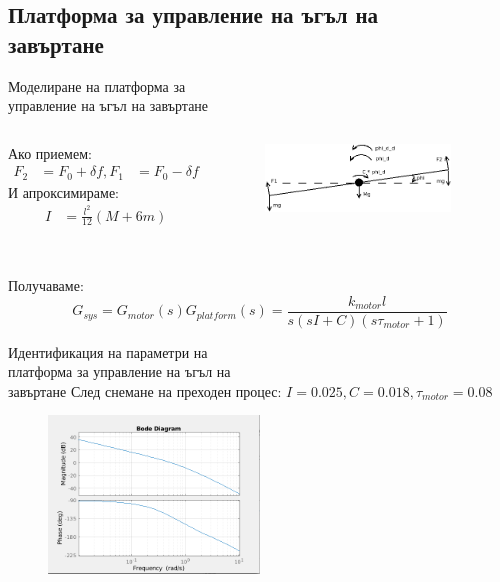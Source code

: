 \documentclass[handout]{beamer}
\begin{document}
\subsection{Платформа за управление на ъгъл на\\ завъртане}

\begin{frame}{Моделиране на платформа за\\управление на ъгъл на завъртане}
	\begin{columns}

		Ако приемем:
		\begin{align*}
			F_2 &= F_0 + \delta f,F_1 &= F_0 - \delta f 
		\end{align*}
		И апроксимираме:
		\begin{align*}
			I &= \frac{l^2}{12}(M + 6m)
		\end{align*}\\[1em]

		
		\begin{figure}[htpb!]
			\centering
			\includegraphics[width=0.9\textwidth]{Images/balance_force_diagram.png}
		\end{figure}

	\end{columns}

	Получаваме:
	\begin{equation*}
	G_{sys} = G_{motor}(s)G_{platform}(s) = 
	\frac{k_{motor} l}{s( s I + C)(s \tau_{motor} + 1)} 
	\end{equation*}

\end{frame}

\begin{frame}{Идентификация на параметри на \\ платформа за управление на ъгъл на \\завъртане}
	След снемане на преходен процес:
	\(I = 0.025, C = 0.018, \tau_{motor} = 0.08\)
			
	\begin{figure}[htpb!]
		\centering
		\includegraphics[width=0.5\textwidth]{Images/bode_balance.png}
	\end{figure}
\end{frame}
\end{document}
